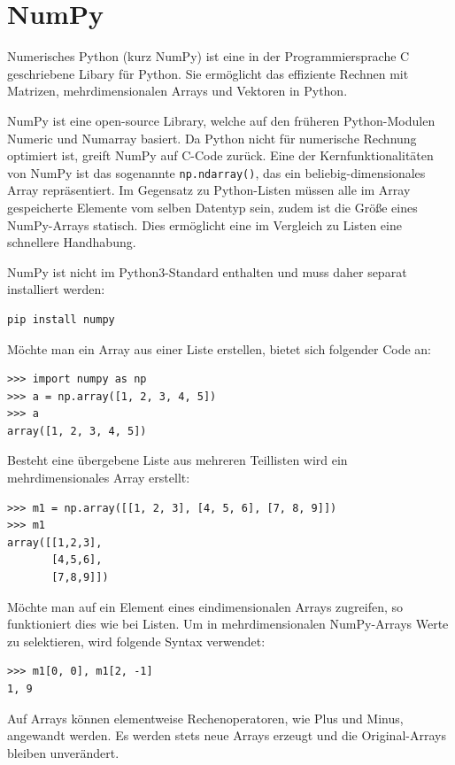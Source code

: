 \documentclass[]{dsadokumentation}
\begin{document}
\section{NumPy}\label{k4.2.ch.NumPy}

Numerisches Python (kurz NumPy) ist eine in der Programmiersprache C geschriebene Libary für Python. Sie ermöglicht das effiziente Rechnen mit Matrizen, mehrdimensionalen Arrays und Vektoren in Python.

NumPy ist eine open-source Library, welche auf den früheren Python-Modulen Numeric und Numarray basiert. Da Python nicht für numerische Rechnung optimiert ist, greift NumPy auf C-Code zurück. Eine der Kernfunktionalitäten von NumPy ist das sogenannte \verb|np.ndarray()|, das ein beliebig-dimensionales Array repräsentiert. Im Gegensatz zu Python-Listen müssen alle im Array gespeicherte Elemente vom selben Datentyp sein, zudem ist die Größe eines NumPy-Arrays statisch. Dies ermöglicht eine im Vergleich zu Listen eine schnellere Handhabung.

NumPy ist nicht im Python3-Standard enthalten und muss daher separat installiert werden:


\begin{verbatim}
pip install numpy
\end{verbatim}

Möchte man ein Array aus einer Liste erstellen, bietet sich folgender Code an:

\begin{verbatim}
>>> import numpy as np
>>> a = np.array([1, 2, 3, 4, 5])
>>> a
array([1, 2, 3, 4, 5])
\end{verbatim}

Besteht eine übergebene Liste aus mehreren Teillisten wird ein mehrdimensionales Array erstellt:

\begin{verbatim}
>>> m1 = np.array([[1, 2, 3], [4, 5, 6], [7, 8, 9]])
>>> m1
array([[1,2,3],
       [4,5,6],
       [7,8,9]])
\end{verbatim}

Möchte man auf ein Element eines eindimensionalen Arrays zugreifen, so funktioniert dies wie bei Listen. Um in mehrdimensionalen NumPy-Arrays Werte zu selektieren, wird folgende Syntax verwendet:

\begin{verbatim}
>>> m1[0, 0], m1[2, -1]
1, 9
\end{verbatim}

Auf Arrays können elementweise Rechenoperatoren, wie Plus und Minus, angewandt werden. Es werden stets neue Arrays erzeugt und die Original-Arrays bleiben unverändert.
\end{document}
